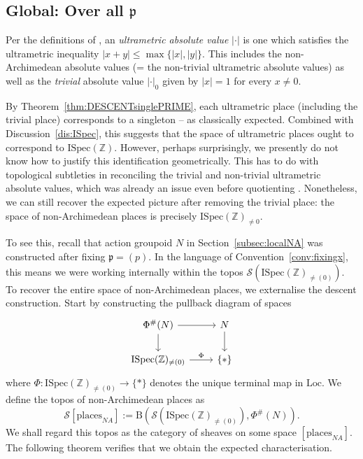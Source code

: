 \documentclass[a4paper, 11pt,reqno]{amsart}
\newcommand{\Loc}{\mathrm{Loc}}
\newcommand{\frap}{\mathfrak{p}}
\newcommand{\ISpec}{\mathrm{ISpec}}
\newcommand{\baseS}{\mathcal{S}}
\newcommand{\Z}{\mathbb{Z}}
\newcommand{\B}{\mathrm{B}}
\begin{document}
\subsection{Global: Over all $\frap$}\label{subsec:globalNA} Per the definitions of \cite{NVOstrowski}, an {\em ultrametric absolute value} $|\cdot|$ is one which satisfies the ultrametric inequality $|x+y|\leq \max\{|x|,|y|\}$. This includes the non-Archimedean absolute values (= the non-trivial ultrametric absolute values) as well as the {\em trivial} absolute value $|\cdot|_0$ given by $|x|=1$ for every $x\neq 0$.


By Theorem~\ref{thm:DESCENTsinglePRIME}, each ultrametric place (including the trivial place) corresponds to a singleton -- as classically expected. Combined with Discussion~\ref{dis:ISpec}, this suggests that the space of ultrametric places ought to correspond to $\ISpec(\Z)$. However, perhaps surprisingly, we presently do not know how to justify this identification geometrically. This has to do with topological subtleties in reconciling the trivial and non-trivial ultrametric absolute values, which was already an issue even before quotienting \cite[\S 6]{NVOstrowski}. Nonetheless, we can still recover the expected picture after removing the trivial place: the space of non-Archimedean places is precisely $\ISpec(\Z)_{\neq 0}$.

To see this, recall that action groupoid $N$ in Section~\ref{subsec:localNA} was constructed after fixing $\frap=(p)$. In the language of Convention~\ref{conv:fixingx}, this means we were working internally within the topos $\baseS(\ISpec(\Z)_{\neq (0)})$. To recover the entire space of non-Archimedean places, we externalise the descent construction. Start by constructing the pullback diagram of spaces
\begin{equation}\label{eq:pullbackISPEC}
\begin{tikzcd}
\Phi^\#(N) \ar[r] \ar[d] & N\ar[d]\\
\ISpec(\Z)_{\neq (0)} \ar[r,"\Phi"] & \{\ast\}
\end{tikzcd}
\end{equation}
where $\Phi\colon \ISpec(\Z)_{\neq (0)} \to \{\ast\}$ denotes the unique terminal map in $\Loc$. We define the topos of non-Archimedean places as $$\baseS[\mathrm{places}_{NA}]:=	\B(\baseS(\ISpec(\mathbb{Z})_{\neq (0)}), \Phi^\#(N)).$$ We shall regard this topos as the category of sheaves on some space $[\mathrm{places}_{NA}]$. The following theorem verifies that we obtain the expected characterisation.
\end{document}
